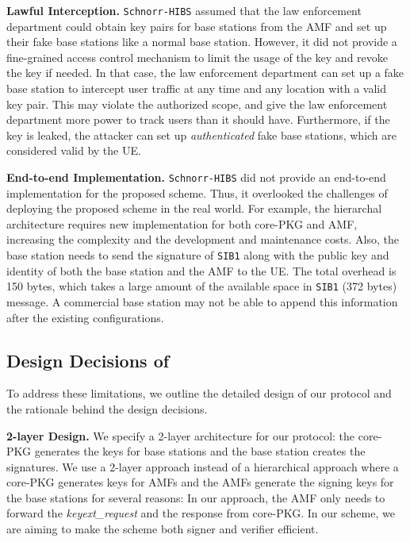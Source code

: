 \noindent \textbf{Lawful Interception. }
\texttt{Schnorr-HIBS} assumed that the law enforcement department could obtain key pairs for base stations from the AMF and set up their fake base stations like a normal base station. However, it did not provide a fine-grained access control mechanism to limit the usage of the key and revoke the key if needed. In that case, the law enforcement department can set up a fake base station to intercept user traffic at any time and any location with a valid key pair. This may violate the authorized scope, and give the law enforcement department more power to track users than it should have. Furthermore, if the key is leaked, the attacker can set up \textit{authenticated} fake base stations, which are considered valid by the UE. 

\noindent \textbf{End-to-end Implementation. }
\texttt{Schnorr-HIBS} did not provide an end-to-end implementation for the proposed scheme. Thus, it overlooked the challenges of deploying the proposed scheme in the real world. For example, the hierarchal architecture requires new implementation for both core-PKG and AMF, increasing the complexity and the development and maintenance costs. Also, the base station needs to send the signature of \texttt{SIB1} along with the public key and identity of both the base station and the AMF to the UE. The total overhead is 150 bytes, which takes a large amount of the available space in \texttt{SIB1} (372 bytes) \cite{3GPP:38.331} message. A commercial base station may not be able to append this information after the existing configurations. 

\subsection{Design Decisions of \scheme{}}
\label{design_decisions}
 To address these limitations, 
we outline the detailed design of our protocol and the rationale behind the design decisions. 

\noindent \textbf{2-layer Design. } 
We specify a 2-layer architecture for our protocol: the core-PKG generates the keys for base stations and the base station creates the signatures. We use a 2-layer approach instead of a hierarchical approach where a core-PKG generates keys for AMFs and the AMFs generate the signing keys for the base stations for several reasons: 
In our approach, the AMF only needs to forward the \textit{keyext\_request} and the response from core-PKG. 
In our scheme, we are aiming to make the scheme both signer and verifier efficient.

